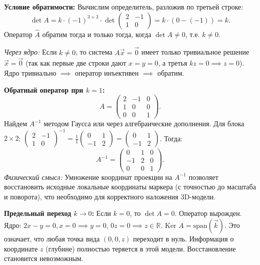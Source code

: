 \documentclass[a4paper,12pt]{article}
\begin{document}
\textbf{Условие обратимости:}
Вычислим определитель, разложив по третьей строке:
\[
\det A = k \cdot (-1)^{3+3} \cdot \det \begin{pmatrix} 2 & -1 \\ 1 & 0 \end{pmatrix} = k \cdot (0 - (-1)) = k.
\]
Оператор $\hat{A}$ обратим тогда и только тогда, когда $\det A \neq 0$, т.е. \textbf{$k \neq 0$}.

\textit{Через ядро:} Если $k \neq 0$, то система $A\vec{x}=\vec{0}$ имеет только тривиальное решение $\vec{x}=\vec{0}$ (так как первые две строки дают $x=y=0$, а третья $kz=0 \implies z=0$). Ядро тривиально $\implies$ оператор инъективен $\implies$ обратим.

\textbf{Обратный оператор при $k=1$:}
\[
A = \begin{pmatrix} 2 & -1 & 0 \\ 1 & 0 & 0 \\ 0 & 0 & 1 \end{pmatrix}.
\]
Найдем $A^{-1}$ методом Гаусса или через алгебраические дополнения.
Для блока $2 \times 2$: $\begin{pmatrix} 2 & -1 \\ 1 & 0 \end{pmatrix}^{-1} = \frac{1}{1} \begin{pmatrix} 0 & 1 \\ -1 & 2 \end{pmatrix} = \begin{pmatrix} 0 & 1 \\ -1 & 2 \end{pmatrix}$.
Тогда:
\[
A^{-1} = \begin{pmatrix} 0 & 1 & 0 \\ -1 & 2 & 0 \\ 0 & 0 & 1 \end{pmatrix}.
\]
\textit{Физический смысл:} Умножение координат проекции на $A^{-1}$ позволяет восстановить исходные локальные координаты маркера (с точностью до масштаба и поворота), что необходимо для корректного наложения 3D-модели.

\textbf{Предельный переход $k \to 0$:}
Если $k=0$, то $\det A = 0$. Оператор вырожден.
Ядро: $2x-y=0, x=0 \implies y=0$, $0z=0 \implies z \in \mathbb{R}$.
$\text{Ker } A = \text{span}(\vec{k})$.
Это означает, что любая точка вида $(0,0,z)$ переходит в нуль. Информация о координате $z$ (глубине) полностью теряется в этой модели. Восстановление становится невозможным.
\end{document}
